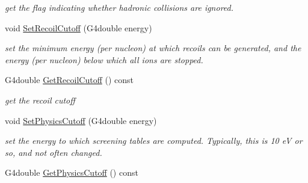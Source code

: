 \begin{DoxyCompactItemize}
\begin{DoxyCompactList}\small\item\em get the flag indicating whether hadronic collisions are ignored. \end{DoxyCompactList}\item 
void \hyperlink{classG4ScreenedNuclearRecoil_a8be39fad23e6953b217f79174c73e9d2}{Set\-Recoil\-Cutoff} (G4double energy)
\begin{DoxyCompactList}\small\item\em set the minimum energy (per nucleon) at which recoils can be generated, and the energy (per nucleon) below which all ions are stopped. \end{DoxyCompactList}\item 
\hypertarget{classG4ScreenedNuclearRecoil_aa9a631028b0882942e3af26694fbc659}{G4double \hyperlink{classG4ScreenedNuclearRecoil_aa9a631028b0882942e3af26694fbc659}{Get\-Recoil\-Cutoff} () const }\label{classG4ScreenedNuclearRecoil_aa9a631028b0882942e3af26694fbc659}

\begin{DoxyCompactList}\small\item\em get the recoil cutoff \end{DoxyCompactList}\item 
void \hyperlink{classG4ScreenedNuclearRecoil_afb8cc92010d3246798fab2eb2983bb4a}{Set\-Physics\-Cutoff} (G4double energy)
\begin{DoxyCompactList}\small\item\em set the energy to which screening tables are computed. Typically, this is 10 e\-V or so, and not often changed. \end{DoxyCompactList}\item 
\hypertarget{classG4ScreenedNuclearRecoil_adcb1df2fdb14a093551c9d9acc675c5f}{G4double \hyperlink{classG4ScreenedNuclearRecoil_adcb1df2fdb14a093551c9d9acc675c5f}{Get\-Physics\-Cutoff} () const }\label{classG4ScreenedNuclearRecoil_adcb1df2fdb14a093551c9d9acc675c5f}


\end{DoxyCompactItemize}
